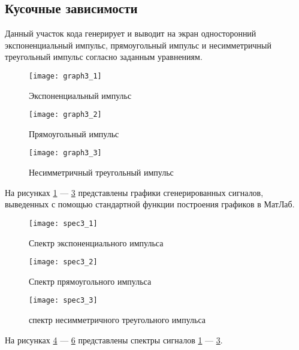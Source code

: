 \subsection{Кусочные зависимости}


\parindent=1cm
Данный участок кода генерирует и выводит на экран односторонний экспоненциальный импульс, прямоугольный импульс и несимметричный треугольный импульс согласно заданным уравнениям.

\begin{figure}[H]
	\begin{center}
		\texttt{[image: graph3\_1]}
		\caption{Экспоненциальный импульс} 
		\label{pic:graph3_1} %
	\end{center}
\end{figure}
\begin{figure}[H]
	\begin{center}
		\texttt{[image: graph3\_2]}
		\caption{Прямоугольный импульс} 
		\label{pic:graph3_2} %
	\end{center}
\end{figure}
\begin{figure}[H]
	\begin{center}
		\texttt{[image: graph3\_3]}
		\caption{Несимметричный треугольный импульс} 
		\label{pic:graph3_3} %
	\end{center}
\end{figure}
На рисунках  \ref{pic:graph3_1} — \ref{pic:graph3_3} представлены графики сгенерированных сигналов, выведенных с помощью стандартной функции построения графиков в МатЛаб.

\begin{figure}[H]
	\begin{center}
		\texttt{[image: spec3\_1]}
		\caption{Спектр экспоненциального импульса} 
		\label{pic:spec3_1} %
	\end{center}
\end{figure}
\begin{figure}[H]
	\begin{center}
		\texttt{[image: spec3\_2]}
		\caption{Спектр прямоугольного импульса} 
		\label{pic:spec3_2} %
	\end{center}
\end{figure}
\begin{figure}[H]
	\begin{center}
		\texttt{[image: spec3\_3]}
		\caption{спектр несимметричного треугольного импульса} 
		\label{pic:spec3_3} %
	\end{center}
\end{figure}
На рисунках  \ref{pic:spec3_1} — \ref{pic:spec3_3} представлены спектры сигналов \ref{pic:graph3_1} — \ref{pic:graph3_3}.

